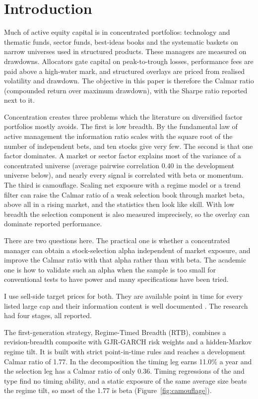 \section{Introduction}

Much of active equity capital is in concentrated portfolios: technology and thematic funds, sector funds, best-ideas books and the systematic baskets on narrow universes used in structured products. These managers are measured on drawdowns. Allocators gate capital on peak-to-trough losses, performance fees are paid above a high-water mark, and structured overlays are priced from realised volatility and drawdown. The objective in this paper is therefore the Calmar ratio (compounded return over maximum drawdown), with the Sharpe ratio reported next to it.

Concentration creates three problems which the literature on diversified factor portfolios mostly avoids. The first is low breadth. By the fundamental law of active management \citep{grinold1989,clarke2002} the information ratio scales with the square root of the number of independent bets, and ten stocks give very few. The second is that one factor dominates. A market or sector factor explains most of the variance of a concentrated universe (average pairwise correlation 0.40 in the development universe below), and nearly every signal is correlated with beta or momentum. The third is camouflage. Scaling net exposure with a regime model or a trend filter can raise the Calmar ratio of a weak selection book through market beta, above all in a rising market, and the statistics then look like skill. With low breadth the selection component is also measured imprecisely, so the overlay can dominate reported performance.

There are two questions here. The practical one is whether a concentrated manager can obtain a stock-selection alpha independent of market exposure, and improve the Calmar ratio with that alpha rather than with beta. The academic one is how to validate such an alpha when the sample is too small for conventional tests to have power and many specifications have been tried.

I use sell-side target prices for both. They are available point in time for every listed large cap and their information content is well documented \citep{brav2003,asquith2005}. The research had four stages, all reported.

 The first-generation strategy, Regime-Timed Breadth (RTB), combines a revision-breadth composite with GJR-GARCH risk weights and a hidden-Markov regime tilt. It is built with strict point-in-time rules and reaches a development Calmar ratio of 1.77. In the decomposition the timing leg earns 11.0\% a year and the selection leg has a Calmar ratio of only 0.36. Timing regressions of the \citet{treynor1966} and \citet{henriksson1981} type find no timing ability, and a static exposure of the same average size beats the regime tilt, so most of the 1.77 is beta (Figure~\ref{fig:camouflage}).


